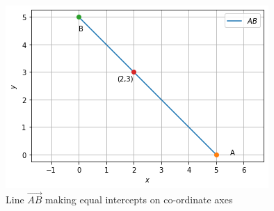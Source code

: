 \begin{figure}[!ht]
       \centering
    \includegraphics[width=\columnwidth] {solutions/aug/2/18/Assignment_4_Fig_1.png}
    \caption{Line $\vec{AB}$ making equal intercepts on co-ordinate axes}
    \label{aug/2/18/Line AB}
\end{figure}

